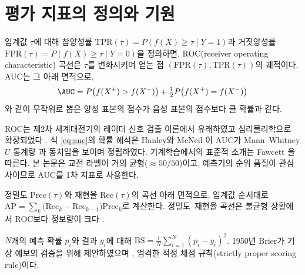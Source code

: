 
\section{평가 지표의 정의와 기원}
\label{sec:bg-metrics}

\begin{definition}
임계값 $\tau$에 대해 참양성률 $\mathrm{TPR}(\tau)=P(f(X)\ge\tau \mid Y=1)$과 거짓양성률 $\mathrm{FPR}(\tau)=P(f(X)\ge\tau \mid Y=0)$을 정의하면, ROC(receiver operating characteristic) 곡선은 $\tau$를 변화시키며 얻는 점 $(\mathrm{FPR}(\tau), \mathrm{TPR}(\tau))$의 궤적이다. AUC는 그 아래 면적으로,
\begin{equation}
  \AUC = P\big(f(X^{+}) > f(X^{-})\big) + \tfrac12 P\big(f(X^{+}) = f(X^{-})\big)
  \label{eq:auc}
\end{equation}
와 같이 무작위로 뽑은 양성 표본의 점수가 음성 표본의 점수보다 클 확률과 같다.
\end{definition}

ROC는 제2차 세계대전기의 레이더 신호 검출 이론에서 유래하였고 심리물리학으로 확장되었다 \cite{green1966signal}. 식 \eqref{eq:auc}의 확률 해석은 Hanley와 McNeil \cite{hanley1982meaning}이 AUC가 Mann--Whitney $U$ 통계량 \cite{mann1947test}과 동치임을 보이며 정립하였다. 기계학습에서의 표준적 소개는 Fawcett \cite{fawcett2006introduction}을 따른다. 본 논문은 교전 라벨이 거의 균형($\approx 50/50$)이고, 예측기의 순위 품질이 관심사이므로 AUC를 1차 지표로 사용한다.

\begin{definition}[평균 정밀도]
정밀도 $\mathrm{Prec}(\tau)$와 재현율 $\mathrm{Rec}(\tau)$의 곡선 아래 면적으로, 임계값 순서대로 $\mathrm{AP} = \sum_k \big(\mathrm{Rec}_k - \mathrm{Rec}_{k-1}\big)\mathrm{Prec}_k$로 계산한다. 정밀도--재현율 곡선은 불균형 상황에서 ROC보다 정보량이 크다 \cite{davis2006relationship}.
\end{definition}

\begin{definition}[Brier 점수]
$N$개의 예측 확률 $p_i$와 결과 $y_i$에 대해 $\mathrm{BS} = \frac{1}{N}\sum_{i=1}^{N}(p_i - y_i)^2$. 1950년 Brier가 기상 예보의 검증을 위해 제안하였으며 \cite{brier1950verification}, 엄격한 적정 채점 규칙(strictly proper scoring rule)이다.
\end{definition}

